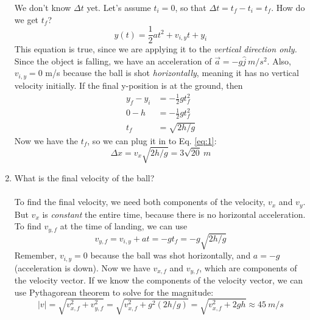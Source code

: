 \documentclass[10pt]{article}
\begin{document}
\begin{enumerate}
We don't know $\Delta t$ yet.  Let's assume $t_i = 0$, so that $\Delta t = t_f - t_i = t_f$.  How do we get $t_f$?
\begin{equation}
y(t) = \frac{1}{2}at^2 + v_{i,y} t + y_{i}
\end{equation}
This equation is true, since we are applying it to the \textit{vertical direction only.}  Since the object is falling, we have an acceleration of $\vec{a} = -g \hat{j} ~ m/s^2$.  Also, $v_{i,y} = 0$ m/s because the ball is shot \textit{horizontally}, meaning it has no vertical velocity initially.  If the final y-position is at the ground, then 
\begin{align}
y_f - y_i &= -\frac{1}{2}gt_f^2 \\
0-h &= -\frac{1}{2}gt_f^2 \\
t_f &= \sqrt{2h/g}
\end{align}
Now we have the $t_f$, so we can plug it in to  Eq. \ref{eq:1}:
\begin{equation}
\Delta x = v_x \sqrt{2h/g} = 3\sqrt{20} ~ m
\end{equation}
\item What is the final velocity of the ball? \\ \\
To find the final velocity, we need both components of the velocity, $v_x$ and $v_y$.  But $v_x$ is \textit{constant} the entire time, because there is no horizontal acceleration.  To find $v_{y,f}$ at the time of landing, we can use
\begin{equation}
v_{y,f} = v_{i,y} + a t = -gt_f = -g \sqrt{2h/g}
\end{equation}
Remember, $v_{i,y} = 0$ because the ball was shot horizontally, and $a = -g$ (acceleration is down).  Now we have $v_{x,f}$ and $v_{y,f}$, which are components of the velocity vector.  If we know the components of the velocity vector, we can use Pythagorean theorem to solve for the magnitude:
\begin{equation}
|v| = \sqrt{v_{x,f}^2 + v_{y,f}^2} = \sqrt{v_{x,f}^2 + g^2 (2h/g)} = \sqrt{v_{x,f}^2 + 2gh} \approx 45 ~ m/s
\end{equation}
\end{enumerate}
\end{document}
